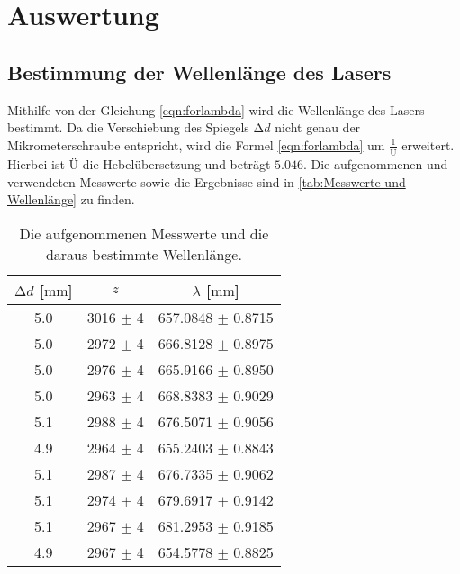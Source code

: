 \section{Auswertung}
\label{sec:Auswertung}

\subsection{Bestimmung der Wellenlänge des Lasers}
\label{subsec:Wellenlänge}

Mithilfe von der Gleichung \eqref{eqn:forlambda} wird die Wellenlänge des Lasers bestimmt.
Da die Verschiebung des Spiegels $\increment d$ nicht genau der Mikrometerschraube entspricht, wird die Formel \eqref{eqn:forlambda} um $\frac{1}{Ü}$ erweitert.
Hierbei ist $Ü$ die Hebelübersetzung und beträgt $5.046$.
Die aufgenommenen und verwendeten Messwerte sowie die Ergebnisse sind in \autoref{tab:Messwerte und Wellenlänge} zu finden.

\begin{table}
  \centering
  \caption{Die aufgenommenen Messwerte und die daraus bestimmte Wellenlänge.}
  \label{tab:Messwerte und Wellenlänge}
  \begin{tabular}{c c c}
    \toprule
    {$\increment d$ [$\si{\milli\metre}$]} & {$z$} & {$\lambda$ [$\si{\milli\metre}$]} \\
    \midrule
    5.0     &       3016 $\pm$ 4    &   657.0848 $\pm$ 0.8715\\
    5.0     &       2972 $\pm$ 4    &   666.8128 $\pm$ 0.8975\\
    5.0     &       2976 $\pm$ 4    &   665.9166 $\pm$ 0.8950\\
    5.0     &       2963 $\pm$ 4    &   668.8383 $\pm$ 0.9029\\
    5.1     &       2988 $\pm$ 4    &   676.5071 $\pm$ 0.9056\\
    4.9     &       2964 $\pm$ 4    &   655.2403 $\pm$ 0.8843\\
    5.1     &       2987 $\pm$ 4    &   676.7335 $\pm$ 0.9062\\
    5.1     &       2974 $\pm$ 4    &   679.6917 $\pm$ 0.9142\\
    5.1     &       2967 $\pm$ 4    &   681.2953 $\pm$ 0.9185\\
    4.9     &       2967 $\pm$ 4    &   654.5778 $\pm$ 0.8825\\
    \bottomrule
  \end{tabular}
\end{table}


